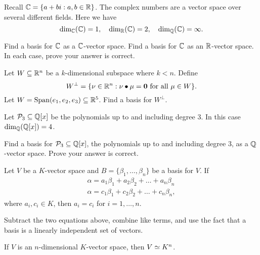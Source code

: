 \documentclass{ximera}
\begin{document}
\begin{example}
   Recall $\mathbb C = \{a+bi:a,b\in\mathbb R\}$. The complex numbers are a vector
   space over several different fields. Here we have
  \[
  \dim_{\mathbb C}(\mathbb C) = 1, \quad \dim_{\mathbb R}(\mathbb C) = 2, \quad \dim_{\mathbb Q}(\mathbb C) =\infty.
  \]
\end{example}

\begin{exercise}
  Find a basis for $\mathbb C$ as a $\mathbb C$-vector space. Find a basis for $\mathbb C$
  as an $\mathbb R$-vector space. In each case, prove your answer is correct.
\end{exercise}


\begin{exercise}
   Let $W\subseteq \mathbb R^n$ be a $k$-dimensional subspace where $k<n$.
   Define
   \[
   W^\perp = \{\nu\in\mathbb R^n: \nu\bullet\mu = \mathbf{0}\text{ for all $\mu\in W$} \}.
   \]
   Let $W = \operatorname{Span}(e_1,e_2,e_3)\subseteq \mathbb R^5$. Find a basis
   for $W^\perp$.
\end{exercise}




\begin{example}
  Let $\mathcal{P}_3\subseteq \mathbb Q[x]$ be the polynomials up to and including degree
  $3$. In this case $\dim_{\mathbb Q}(\mathbb Q[x]) = 4$.
\end{example}

\begin{exercise}
  Find a basis for $\mathcal{P}_3\subseteq \mathbb Q[x]$, the polynomials up to and
  including degree $3$, as a $\mathbb Q$-vector space. Prove your answer is
  correct.
\end{exercise}


\begin{theorem}
  Let $V$ be a $K$-vector space and $B = \{\beta_1,\dots,\beta_n\}$ be a
  basis for $V$. If
  \begin{align*}
  \alpha = a_1\beta_1 + a_2\beta_2 + \dots + a_n\beta_n\\
  \alpha = c_1\beta_1 + c_2\beta_2 + \dots + c_n\beta_n,
  \end{align*}
  where $a_i, c_i\in K$, then $a_i = c_i$ for $i =1,\dots, n$.
  \begin{sketch}
    Subtract the two equations above, combine like terms, and use the
    fact that a basis is a linearly independent set of vectors.
  \end{sketch}
\end{theorem}


\begin{corollary}\label{C:stvs}
  If $V$ is an $n$-dimensional $K$-vector space, then $V\simeq K^n$.
\end{corollary}
\end{document}

